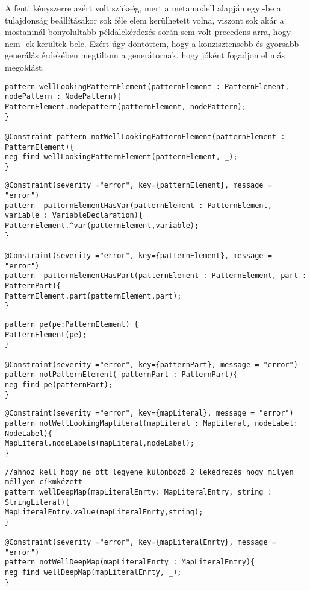 A fenti kényszerre azért volt szükség, mert a metamodell alapján egy -be a  tulajdonság beállításakor sok féle elem kerülhetett volna, viszont sok akár a mostaninál bonyolultabb példalekérdezés során sem volt precedens arra, hogy nem  -ek kerültek bele. Ezért úgy döntöttem, hogy a konzisztensebb és gyorsabb generálás érdekében megtiltom a generátornak, hogy jóként fogadjon el más megoldást.

\begin{lstlisting}[style=viatrasmall]
pattern wellLookingPatternElement(patternElement : PatternElement, nodePattern : NodePattern){
PatternElement.nodepattern(patternElement, nodePattern);
}

@Constraint pattern notWellLookingPatternElement(patternElement : PatternElement){
neg find wellLookingPatternElement(patternElement, _);
}
\end{lstlisting}


\begin{lstlisting}[style=viatrasmall]
@Constraint(severity ="error", key={patternElement}, message = "error")
pattern  patternElementHasVar(patternElement : PatternElement, variable : VariableDeclaration){
PatternElement.^var(patternElement,variable);
}

@Constraint(severity ="error", key={patternElement}, message = "error")
pattern  patternElementHasPart(patternElement : PatternElement, part : PatternPart){
PatternElement.part(patternElement,part);
}
\end{lstlisting}

\begin{lstlisting}[style=viatrasmall]
pattern pe(pe:PatternElement) {
PatternElement(pe);
}

@Constraint(severity ="error", key={patternPart}, message = "error")
pattern notPatternElement( patternPart : PatternPart){
neg find pe(patternPart);
}
\end{lstlisting}

\begin{lstlisting}[style=viatrasmall]
@Constraint(severity ="error", key={mapLiteral}, message = "error")
pattern notWellLookingMapliteral(mapLiteral : MapLiteral, nodeLabel: NodeLabel){
MapLiteral.nodeLabels(mapLiteral,nodeLabel);
}

\end{lstlisting}

\begin{lstlisting}[style=viatrasmall]
//ahhoz kell hogy ne ott legyene különböző 2 lekédrezés hogy milyen méllyen cíkmkézett
pattern wellDeepMap(mapLiteralEnrty: MapLiteralEntry, string : StringLiteral){
MapLiteralEntry.value(mapLiteralEnrty,string);
}

@Constraint(severity ="error", key={mapLiteralEnrty}, message = "error")
pattern notWellDeepMap(mapLiteralEnrty : MapLiteralEntry){
neg find wellDeepMap(mapLiteralEnrty, _);
}
\end{lstlisting}


